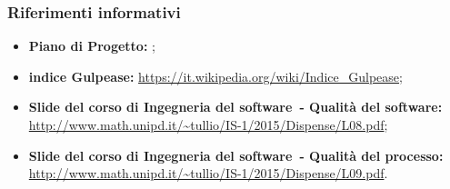 \documentclass[../PianoDiQualifica.tex]{subfiles}
\begin{document}
		\subsubsection{Riferimenti informativi}
		\begin{itemize}
			\item \textbf{Piano di Progetto:} \pianodiprogettov;
			\item \textbf{indice Gulpease\g:} \url{https://it.wikipedia.org/wiki/Indice\_Gulpease};
			\item \textbf{Slide del corso di Ingegneria del software\g\ - Qualità del software\g:} \\\url{http://www.math.unipd.it/~tullio/IS-1/2015/Dispense/L08.pdf};
			\item \textbf{Slide del corso di Ingegneria del software\g\ - Qualità del processo\g:} \\\url{http://www.math.unipd.it/~tullio/IS-1/2015/Dispense/L09.pdf}.
		\end{itemize}
\end{document}
